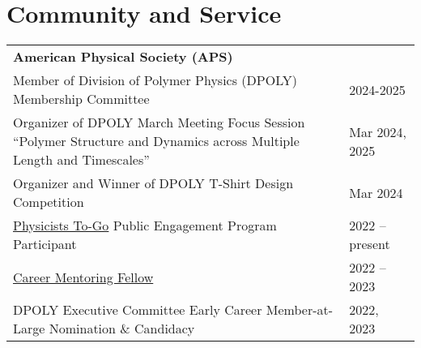 \documentclass[letterpaper,11pt]{article}
\begin{document}
\section*{Community and Service}
\vspace{-1.0\baselineskip}
\begin{longtable}{@{}p{}l@{}}
  \multicolumn{2}{l}{\hspace{-3mm} \bf{American Physical Society (APS)}}                                                                                                                                                             \\
  \hspace{3mm} Member of Division of Polymer Physics (DPOLY) Membership Committee                                                                                                                                 & 2024-2025        \\
  \hspace{3mm} Organizer of DPOLY March Meeting Focus Session ``Polymer Structure and Dynamics across Multiple Length and Timescales''                                                                            & Mar 2024, 2025   \\
  \hspace{3mm} Organizer and Winner of DPOLY T-Shirt Design Competition                                                                                                                                           & Mar 2024         \\
  \hspace{3mm} \href{https://www.aps.org/programs/outreach/physiciststogo.cfm}{Physicists To-Go} Public Engagement Program Participant                                                                            & 2022 -- present  \\
  \hspace{3mm} \href{https://www.aps.org/careers/guidance/mentoring.cfm}{Career Mentoring Fellow}                                                                                                                 & 2022 -- 2023     \\
  \hspace{3mm} DPOLY Executive Committee Early Career Member-at-Large Nomination \& Candidacy                                                                                                                     & 2022, 2023       \\   

\end{longtable}
\end{document}
